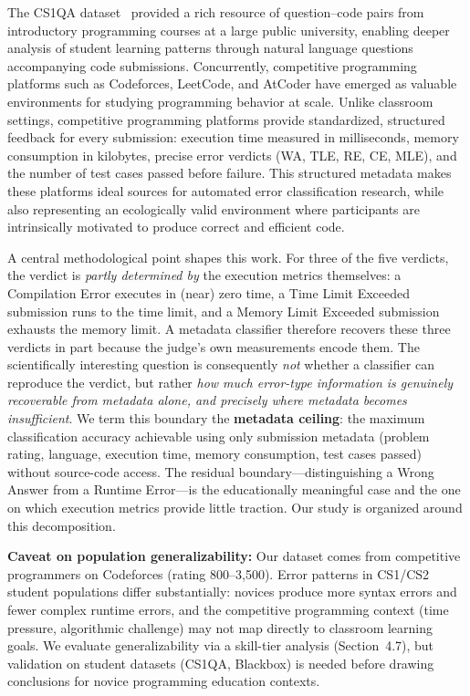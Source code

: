 \documentclass[acmsmall]{acmart}
\begin{document}
The CS1QA dataset~\cite{lee2022cs1qa} provided a rich resource
of question--code pairs from introductory programming courses at a large
public university, enabling deeper analysis of student learning patterns
through natural language questions accompanying code submissions.
Concurrently, competitive programming platforms such as Codeforces, LeetCode,
and AtCoder have emerged as valuable environments for studying programming
behavior at scale. Unlike classroom settings, competitive programming
platforms provide standardized, structured feedback for every submission:
execution time measured in milliseconds, memory consumption in kilobytes,
precise error verdicts (WA, TLE, RE, CE, MLE), and the number of test cases
passed before failure. This structured metadata makes these platforms ideal
sources for automated error classification research, while also representing
an ecologically valid environment where participants are intrinsically
motivated to produce correct and efficient code.

A central methodological point shapes this work. For three of the five
verdicts, the verdict is \emph{partly determined by} the execution metrics
themselves: a Compilation Error executes in (near) zero time, a Time Limit
Exceeded submission runs to the time limit, and a Memory Limit Exceeded
submission exhausts the memory limit. A metadata classifier therefore recovers
these three verdicts in part because the judge's own measurements encode them.
The scientifically interesting question is consequently \emph{not} whether a
classifier can reproduce the verdict, but rather \emph{how much error-type
information is genuinely recoverable from metadata alone, and precisely where
metadata becomes insufficient}. We term this boundary the \textbf{metadata ceiling}:
the maximum classification accuracy achievable using only submission metadata
(problem rating, language, execution time, memory consumption, test cases passed)
without source-code access. The residual boundary---distinguishing a Wrong
Answer from a Runtime Error---is the educationally meaningful case and the one
on which execution metrics provide little traction. Our study is organized
around this decomposition.

\textbf{Caveat on population generalizability:} Our dataset comes from
competitive programmers on Codeforces (rating 800--3,500). Error patterns in
CS1/CS2 student populations differ substantially: novices produce more syntax
errors and fewer complex runtime errors, and the competitive programming
context (time pressure, algorithmic challenge) may not map directly to
classroom learning goals. We evaluate generalizability via a skill-tier analysis
(Section~4.7), but validation on student datasets (CS1QA, Blackbox) is needed
before drawing conclusions for novice programming education contexts.
\end{document}
